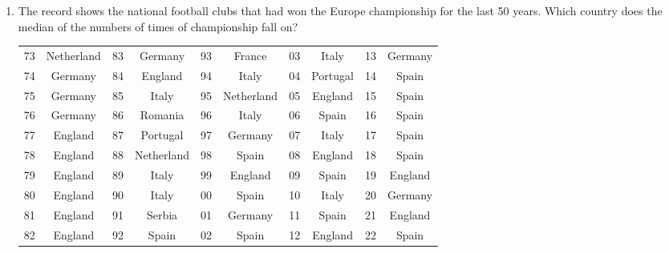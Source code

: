 \documentclass[11pt]{scrartcl}
\begin{document}
\begin{enumerate}[resume]
        \begin{center}
        \end{center}

    \item The record shows the national football clubs that had won the Europe championship for the last 50 years. Which country does the median of the numbers of times of championship fall on?
    \vspace{\baselineskip}
    \begin{tabular}{cc|cc|cc|cc|cc}
        \hline\hline
        73 & Netherland & 83 & Germany & 93 & France & 03 & Italy & 13 & Germany\\
        74 & Germany & 84 & England & 94 & Italy & 04 & Portugal & 14 & Spain\\
        75 & Germany & 85 & Italy & 95 & Netherland & 05 & England & 15 & Spain\\
        76 & Germany & 86 & Romania & 96 & Italy & 06 & Spain & 16 & Spain\\
        77 & England & 87 & Portugal & 97 & Germany & 07 & Italy & 17 & Spain\\
        78 & England & 88 & Netherland & 98 & Spain & 08 & England & 18 & Spain\\
        79 & England & 89 & Italy & 99 & England & 09 & Spain & 19 & England\\
        80 & England & 90 & Italy & 00 & Spain & 10 & Italy & 20 & Germany\\
        81 & England & 91 & Serbia & 01 & Germany & 11 & Spain & 21 & England\\
        82 & England & 92 & Spain & 02 & Spain & 12 & England & 22 & Spain\\
    \hline\hline
    \end{tabular}


\end{enumerate}
\end{document}
